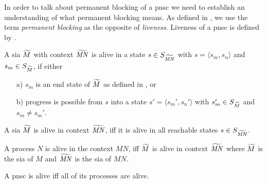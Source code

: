 In order to talk about permanent blocking of a \gls{pnsc} we need to establish an understanding of what permanent blocking means.
As defined in \Equ{\ref{eq_liveness}}, we use the term \emph{permanent blocking} as the opposite of \emph{liveness}.
Liveness of a \gls{pnsc} is defined by .

\begin{definition}
    \label{def_liveness_sia_state}
    A \gls{sia} $\widetilde{M}$ with context $\widetilde{\mathit{MN}}$ is alive in a state $s \in S_{\widetilde{\mathit{MN}}}$ with $s=\langle s_m, s_n\rangle$ and $s_m \in S_{\widetilde{M}}$, if either
    \begin{enumerate}
    \item[a)] $s_m$ is an end state of $\widetilde{M}$ as defined in \Equ{\ref{eq_sia_end}}, or
    \item[b)] progress is possible from $s$ into a state $s'=\langle s_m', s_n'\rangle$ with $s_m' \in S_{\widetilde{M}}$ and $s_m \neq s_m'$.
    \end{enumerate} 
\end{definition}

\begin{definition}
    \label{def_liveness_sia}
    A \gls{sia} $\widetilde{M}$ is alive in context $\widetilde{\mathit{MN}}$, iff it is alive in all reachable states $s \in S_{\widetilde{\mathit{MN}}}$.
\end{definition}

\begin{definition}
    \label{def_liveness_process}
    A process $N$ is alive in the context $\mathit{MN}$, iff $\widetilde{M}$ is alive in context $\widetilde{\mathit{MN}}$ where $\widetilde{M}$ is the \gls{sia} of $M$ and $\widetilde{\mathit{MN}}$ is the \gls{sia} of $\mathit{MN}$.
\end{definition}

\begin{definition}
    \label{def_liveness}
    A \gls{pnsc} is alive iff all of its processes are alive.
\end{definition}

